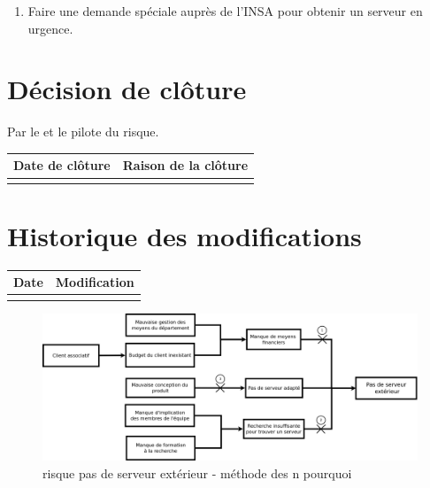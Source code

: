 \begin{enumerate}
	\item Faire une demande spéciale auprès de l'INSA pour obtenir un serveur en urgence.
\end{enumerate}

%
%
%
%

\section*{Décision de clôture}
Par le \CP{} et le pilote du risque.
\begin{table}[H]
\centering
	\begin{tabularx}{16.8cm}{|X|X|}
	\hline
	\rowcolor{gray!40} Date de clôture & Raison de la clôture \\
	\hline
	  & \\
	\hline
	\end{tabularx}
\end{table}

\section*{Historique des modifications}
\begin{table}[H]
\centering
	\begin{tabularx}{16.8cm}{|X|X|}
	\hline
	Date & Modification \\
	\hline
	  & \\
	\hline
	\end{tabularx}
\end{table}
\newpage

\begin{figure}
	\centering
	\includegraphics[scale=0.15]{images/AnalyseRisque_nPourquoi_FDR009}
	\caption{\label{risque pas de serveur ext}risque pas de serveur extérieur - méthode des n pourquoi}
\end{figure}